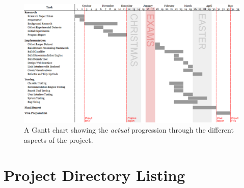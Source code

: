 \documentclass[11pt,a4paper]{report}
\begin{document}
\begin{subappendices}
\begin{landscape}
    \begin{figure}[H]
        \centering
        \includegraphics[height=0.86\textwidth]{gantt-actual.png}
        \caption*{A Gantt chart showing the \emph{actual} progression through the different aspects of the project.}
    \end{figure}
\end{landscape}
\pagebreak

\section{Project Directory Listing}
\label{appendix:directorytree}
\pagebreak


\end{subappendices}
\end{document}
